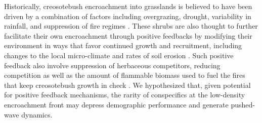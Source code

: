 \documentclass[11pt]{article}\usepackage[]{graphicx}\usepackage[usenames,dvipsnames]{xcolor}
\begin{document}
Historically, creosotebush encroachment into grasslands is believed to have been driven by a combination of factors including overgrazing, drought, variability in rainfall, and suppression of fire regimes \cite{moreno2016seed}.
These shrubs are also thought to further facilitate their own encroachment through positive feedbacks \citep{grover1990shrubland, d2012synthetic} by modifying their environment in ways that favor continued growth and recruitment, including changes to the local micro-climate \citep{d2010positive} and rates of soil erosion \citep{turnbull2010changes}.
Such positive feedback also involve suppression of herbaceous competitors, reducing competition as well as the amount of flammable biomass used to fuel the fires that keep creosotebush growth in check \citep{van2000shrub}.
We hypothesized that, given potential for positive feedback mechanisms, the rarity of conspecifics at the low-density encroachment front may depress demographic performance and generate pushed-wave dynamics.

\end{document}
